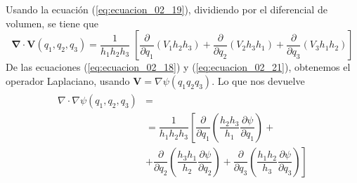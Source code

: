 Usando la ecuación (\ref{eq:ecuacion_02_19}), dividiendo por el diferencial de volumen, se tiene que
\begin{equation}
\bm{\nabla \cdot V}(q_{1},q_{2},q_{3}) = \dfrac{1}{h_{1} h_{2} h_{3}} \; \left[ \dfrac{\partial}{\partial q_{1}} (V_{1} h_{2} h_{3}) + \dfrac{\partial}{\partial q_{2}} (V_{2} h_{3} h_{1}) + \dfrac{\partial}{\partial q_{3}} (V_{3} h_{1} h_{2})   \right]
\label{eq:ecuacion_02_21}
\end{equation}
De las ecuaciones (\ref{eq:ecuacion_02_18}) y (\ref{eq:ecuacion_02_21}), obtenemos el operador Laplaciano, usando $\mathbf{V} = \nabla \psi(q_{1} q_{2} q_{3})$. Lo que nos devuelve
\begin{eqnarray}
\begin{aligned}
\nabla \cdot \nabla \psi (q_{1}, q_{2}, q_{3}) &= \\
&= \dfrac{1}{h_{1} h_{2} h_{3}} \left[ \dfrac{\partial}{\partial q_{1}} \left( \dfrac{h_{2}h_{3}}{h_{1}} \dfrac{\partial \psi}{\partial q_{1}} \right) + \right. \\
&+ \left.  \dfrac{\partial}{\partial q_{2}} \left( \dfrac{h_{3}h_{1}}{h_{2}} \dfrac{\partial \psi}{\partial q_{2}} \right) + \dfrac{\partial}{\partial q_{3}} \left( \dfrac{h_{1}h_{2}}{h_{3}} \dfrac{\partial \psi}{\partial q_{3}} \right) \right]  
\end{aligned}
\label{eq:ecuacion_02_22}
\end{eqnarray}

